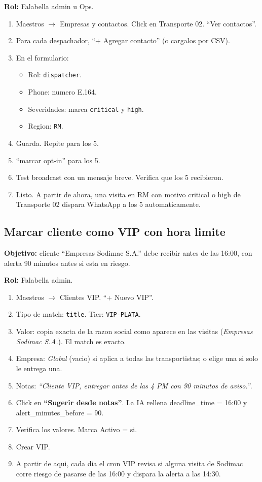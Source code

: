 \documentclass[11pt,a4paper]{article}
\begin{document}
\textbf{Rol:} Falabella admin u Ops.

\begin{enumerate}
  \item Maestros $\rightarrow$ Empresas y contactos. Click en
        Transporte 02. ``Ver contactos''.
  \item Para cada despachador, ``+ Agregar contacto'' (o cargalos por
        CSV).
  \item En el formulario:
    \begin{itemize}
      \item Rol: \texttt{dispatcher}.
      \item Phone: numero E.164.
      \item Severidades: marca \texttt{critical} y \texttt{high}.
      \item Region: \texttt{RM}.
    \end{itemize}
  \item Guarda. Repite para los 5.
  \item ``marcar opt-in'' para los 5.
  \item Test broadcast con un mensaje breve. Verifica que los 5
        recibieron.
  \item Listo. A partir de ahora, una visita en RM con motivo critical
        o high de Transporte 02 dispara WhatsApp a los 5
        automaticamente.
\end{enumerate}

\subsection{Marcar cliente como VIP con hora limite}

\textbf{Objetivo:} cliente ``Empresas Sodimac S.A.'' debe recibir
antes de las 16:00, con alerta 90 minutos antes si esta en riesgo.

\textbf{Rol:} Falabella admin.

\begin{enumerate}
  \item Maestros $\rightarrow$ Clientes VIP. ``+ Nuevo VIP''.
  \item Tipo de match: \texttt{title}. Tier: \texttt{VIP-PLATA}.
  \item Valor: copia exacta de la razon social como aparece en las
        visitas (\emph{Empresas Sodimac S.A.}). El match es exacto.
  \item Empresa: \emph{Global} (vacio) si aplica a todas las
        transportistas; o elige una si solo le entrega una.
  \item Notas: \emph{``Cliente VIP, entregar antes de las 4 PM con
        90 minutos de aviso.''}.
  \item Click en \textbf{``Sugerir desde notas''}. La IA rellena
        deadline\_time = 16:00 y alert\_minutes\_before = 90.
  \item Verifica los valores. Marca Activo = si.
  \item Crear VIP.
  \item A partir de aqui, cada dia el cron VIP revisa si alguna visita
        de Sodimac corre riesgo de pasarse de las 16:00 y dispara la
        alerta a las 14:30.
\end{enumerate}
\end{document}
